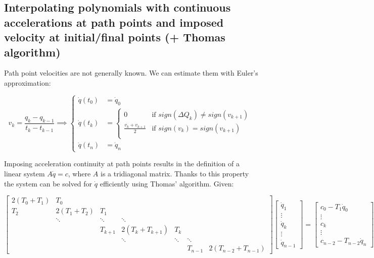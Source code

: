 \newpage

\subsection{Interpolating polynomials with continuous accelerations at path points and imposed velocity at initial/final points (+ Thomas algorithm)}

Path point velocities are not generally known. We can estimate them with Euler's approximation:

\begin{equation*}
v_k = \frac{q_k-q_{k-1}}{t_k-t_{k-1}}\implies\begin{cases}
\dot q(t_0)&=\dot q_0\\
\dot q(t_k)&=\begin{cases}
0 & \text{if }sign(\Delta Q_k)\neq sign(v_{k+1})\\
\frac{v_k+v_{k+1}}{2} &  \text{if }sign(v_k) =  sign(v_{k+1})\\
\end{cases}\\
\dot q(t_n) &= \dot q_n
\end{cases}
\end{equation*}

Imposing acceleration continuity at path points results in the definition of a linear system $A\dot q=c$, where $A$ is a tridiagonal matrix. Thanks to this property the system can be solved for $\dot q$ efficiently using Thomas' algorithm. Given:

\begin{equation*}
\begin{bmatrix}
2(T_0+T_1) & T_0 &  &\\
T_2 & 2(T_1+T_2) & T_1 &  & \\
 & \ddots & \ddots & \ddots &  & \\
& & T_{k+1} & 2(T_k+T_{k+1}) & T_k &  & \\
& & & \ddots & \ddots & \ddots &  \\
& & & & & T_{n-1} & 2(T_{n-2} + T_{n-1})
\end{bmatrix}\begin{bmatrix}
\dot q_1\\\vdots\\\dot  q_k\\\vdots \\ \dot q_{n-1}
\end{bmatrix}=\begin{bmatrix}
c_0-T_1\dot q_0\\\vdots\\ c_k\\\vdots \\ c_{n-2}-T_{n-2}\dot q_n
\end{bmatrix}
\end{equation*}

